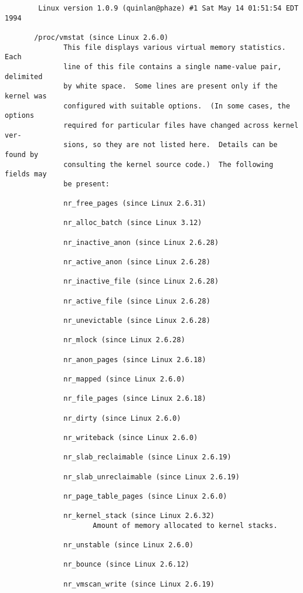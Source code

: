 \documentclass[]{article}
\begin{document}
\begin{verbatim}
        Linux version 1.0.9 (quinlan@phaze) #1 Sat May 14 01:51:54 EDT 1994

       /proc/vmstat (since Linux 2.6.0)
              This file displays various virtual memory statistics.  Each
              line of this file contains a single name-value pair, delimited
              by white space.  Some lines are present only if the kernel was
              configured with suitable options.  (In some cases, the options
              required for particular files have changed across kernel ver‐
              sions, so they are not listed here.  Details can be found by
              consulting the kernel source code.)  The following fields may
              be present:

              nr_free_pages (since Linux 2.6.31)

              nr_alloc_batch (since Linux 3.12)

              nr_inactive_anon (since Linux 2.6.28)

              nr_active_anon (since Linux 2.6.28)

              nr_inactive_file (since Linux 2.6.28)

              nr_active_file (since Linux 2.6.28)

              nr_unevictable (since Linux 2.6.28)

              nr_mlock (since Linux 2.6.28)

              nr_anon_pages (since Linux 2.6.18)

              nr_mapped (since Linux 2.6.0)

              nr_file_pages (since Linux 2.6.18)

              nr_dirty (since Linux 2.6.0)

              nr_writeback (since Linux 2.6.0)

              nr_slab_reclaimable (since Linux 2.6.19)

              nr_slab_unreclaimable (since Linux 2.6.19)

              nr_page_table_pages (since Linux 2.6.0)

              nr_kernel_stack (since Linux 2.6.32)
                     Amount of memory allocated to kernel stacks.

              nr_unstable (since Linux 2.6.0)

              nr_bounce (since Linux 2.6.12)

              nr_vmscan_write (since Linux 2.6.19)


\end{verbatim}
\end{document}
